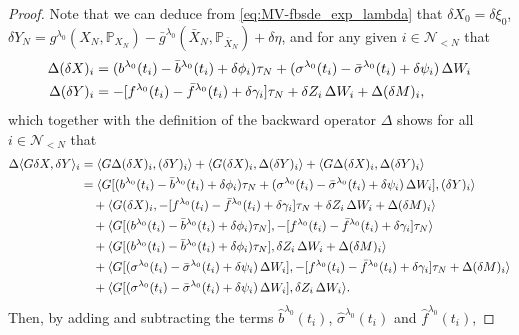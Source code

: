 \documentclass[11pt]{article}
\numberwithin{equation}{section}
\theoremstyle{definition}
\theoremstyle{remark}
\def\l{\label}  \def\f{\frac}  \def\fa{\forall}
\def \la{\langle} \def\ra{\rangle}
\def\cN{\mathcal{N}}
\def\sP{\mathbb{P}}
\begin{document}
\begin{proof}
Note that
we can deduce from  \eqref{eq:MV-fbsde_exp_lambda} that
$\delta X_0=\delta \xi_0$,
$\delta Y_N=g^{\lambda_0}(X_N,\sP_{X_N})-\bar{g}^{\lambda_0}(\bar{X}_N,\sP_{\bar{X}_N})
+\delta \eta$,
and 
for any given $i\in \cN_{<N}$ that
\begin{align}
\Delta (\delta {X})_{i}
&=
(b^{\lambda_0}(t_{i})-\bar{b}^{\lam_0}(t_{i})+\delta \phi_{i})\tau_N  +
(\sigma^{\lambda_0}(t_i)-\bar{\sigma}^{\lambda_0}(t_i)+\delta \psi_{i})\,\Delta W_i
\l{eq:delta_X_lambda}
\\
\Delta (\delta {Y})_{i}
&=
-[f^{\lambda_0}(t_{i})-\bar{f}^{\lambda_0}(t_{i})+\delta \gamma_i]\tau_N+\delta  {Z}_i\,\Delta W_i+\Delta (\delta {M})_i,
\l{eq:delta_Y_lambda}
\end{align}
which together with 
the definition of the backward operator $\Delta$ 
shows for all $i\in\cN_{<N}$
  that
\begin{align*}%
\begin{split}
\Delta \la G\delta X,\delta Y\ra_i
&=  \la G\Delta (\delta X)_{i}, (\delta Y)_{i}\ra+\la  G (\delta X)_i, \Delta(\delta Y)_i\ra
+\la  G \Delta(\delta X)_i, \Delta(\delta Y)_i\ra
\\
&=
\la G[(b^{\lambda_0}(t_{i})-\bar{b}^{\lam_0}(t_{i})+\delta \phi_{i})\tau_N+(\sigma^{\lambda_0}(t_i)-\bar{\sigma}^{\lambda_0}(t_i)+\delta \psi_{i})\,\Delta W_i], (\delta Y)_{i}\ra
\\
& \quad
+\la  G (\delta X)_i, -[f^{\lambda_0}(t_{i})-\bar{f}^{\lambda_0}(t_{i})+\delta \gamma_i]\tau_N+\delta  {Z}_i\,\Delta W_i+\Delta (\delta {M})_i \ra
\\
&\quad
+
\la  G [(b^{\lambda_0}(t_{i})-\bar{b}^{\lam_0}(t_{i})+\delta \phi_{i})\tau_N],
-[f^{\lambda_0}(t_{i})-\bar{f}^{\lambda_0}(t_{i})+\delta \gamma_i]\tau_N
\ra
\\
&\quad
+
\la  G [(b^{\lambda_0}(t_{i})-\bar{b}^{\lam_0}(t_{i})+\delta \phi_{i})\tau_N], 
\delta  {Z}_i\,\Delta W_i+\Delta (\delta {M})_i
\ra
\\
&\quad
+
\la  G [(\sigma^{\lambda_0}(t_i)-\bar{\sigma}^{\lambda_0}(t_i)+\delta \psi_{i})\,\Delta W_i], 
-[f^{\lambda_0}(t_{i})-\bar{f}^{\lambda_0}(t_{i})+\delta \gamma_i]\tau_N+\Delta (\delta {M})_i
\ra
\\
&\quad
+
\la  G [(\sigma^{\lambda_0}(t_i)-\bar{\sigma}^{\lambda_0}(t_i)+\delta \psi_{i})\,\Delta W_i], 
\delta  {Z}_i\,\Delta W_i
\ra.
 \end{split}
  \end{align*}
  Then, by adding and subtracting the terms $\hat{b}^{\lambda_0}(t_{i})$, $\hat{\sigma}^{\lambda_0}(t_{i})$ and $\hat{f}^{\lambda_0}(t_{i})$, 

\end{proof}
\end{document}
